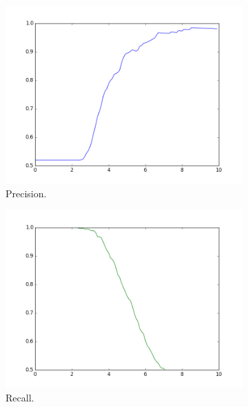 \documentclass[information,article,submit,moreauthors,pdftex,10pt,a4paper]{Definitions/mdpi}
\begin{document}
\begin{figure}[H]
  \centering
  \begin{subfigure}[b]{0.48\linewidth}
    \includegraphics[width=\linewidth]{precision}
    \caption{Precision.}\label{fig:precision}
  \end{subfigure}
  \begin{subfigure}[b]{0.48\linewidth}
    \includegraphics[width=\linewidth]{recall}
    \caption{Recall.}\label{fig:recall}
  \end{subfigure}
  \begin{subfigure}[b]{0.48\linewidth}

\end{subfigure}
\end{figure}
\end{document}
